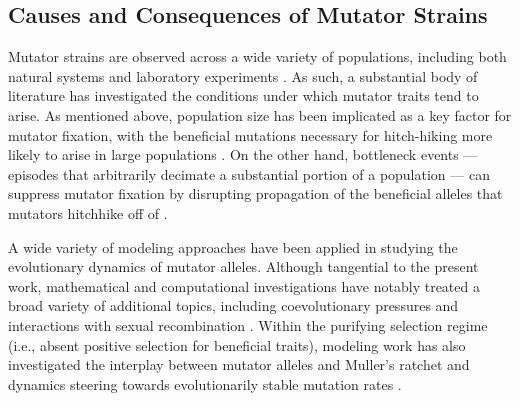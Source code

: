 \subsection{Causes and Consequences of Mutator Strains}

Mutator strains are observed across a wide variety of populations, including both natural systems and laboratory experiments \citep{sniegowski1997evolution,swings2017adaptive,maddamsetti2020divergent,cherry2018methylation,notleymcrobb2002enrichment,shaver2002fitness,voordeckers2015adaptation,leclerc1996high}.
As such, a substantial body of literature has investigated the conditions under which mutator traits tend to arise.
As mentioned above, population size has been implicated as a key factor for mutator fixation, with the beneficial mutations necessary for hitch-hiking more likely to arise in large populations \citep{chao1983competition}.
On the other hand, bottleneck events --- episodes that arbitrarily decimate a substantial portion of a population --- can suppress mutator fixation by disrupting propagation of the beneficial alleles that mutators hitchhike off of \citep{raynes2013effect}.

A wide variety of modeling approaches have been applied in studying the evolutionary dynamics of mutator alleles.
Although tangential to the present work, mathematical and computational investigations have notably treated a broad variety of additional topics, including coevolutionary pressures \citep{pal2007coevolution} and interactions with sexual recombination \citep{johnson1999beneficial}.
Within the purifying selection regime (i.e., absent positive selection for beneficial traits), modeling work has also investigated the interplay between mutator alleles and Muller's ratchet \citep{soderberg2011kickstarting} and dynamics steering towards evolutionarily stable mutation rates \citep{lynch2008cellular}.

